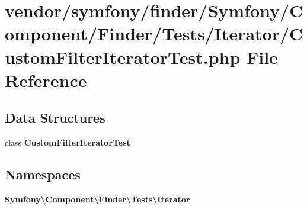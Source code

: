 \section{vendor/symfony/finder/\+Symfony/\+Component/\+Finder/\+Tests/\+Iterator/\+Custom\+Filter\+Iterator\+Test.php File Reference}
\label{_custom_filter_iterator_test_8php}
\subsection*{Data Structures}
\begin{DoxyCompactItemize}
\item 
class {\bf Custom\+Filter\+Iterator\+Test}
\end{DoxyCompactItemize}
\subsection*{Namespaces}
\begin{DoxyCompactItemize}
\item 
 {\bf Symfony\textbackslash{}\+Component\textbackslash{}\+Finder\textbackslash{}\+Tests\textbackslash{}\+Iterator}
\end{DoxyCompactItemize}
